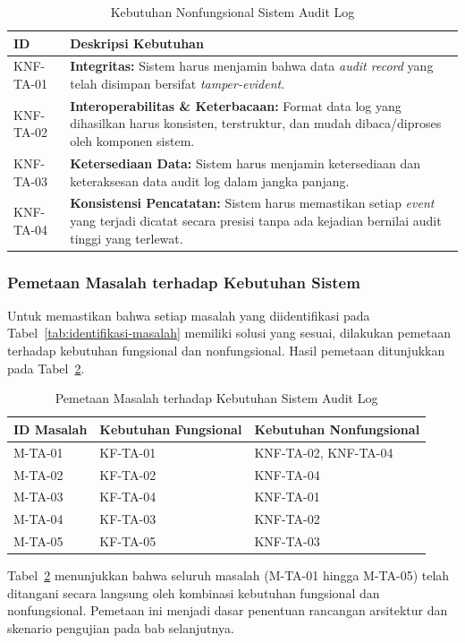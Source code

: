 \begin{table}[htbp]
    \centering
    \caption{Kebutuhan Nonfungsional Sistem Audit Log}
    \label{tab:kebutuhan-nonfungsional}
    \renewcommand{\arraystretch}{1.3}
    \begin{tabular}{|p{2cm}|p{11.5cm}|}
        \hline
        \textbf{ID} & \textbf{Deskripsi Kebutuhan} \\
        \hline
        KNF-TA-01 & \textbf{Integritas:} Sistem harus menjamin bahwa data \textit{audit record} yang telah disimpan bersifat \textit{tamper-evident}. \\
        \hline
        KNF-TA-02 & \textbf{Interoperabilitas \& Keterbacaan:} Format data log yang dihasilkan harus konsisten, terstruktur, dan mudah dibaca/diproses oleh komponen sistem. \\
        \hline
        KNF-TA-03 & \textbf{Ketersediaan Data:} Sistem harus menjamin ketersediaan dan keteraksesan data audit log dalam jangka panjang. \\
        \hline
        KNF-TA-04 & \textbf{Konsistensi Pencatatan:} Sistem harus memastikan setiap \textit{event} yang terjadi dicatat secara presisi tanpa ada kejadian bernilai audit tinggi yang terlewat. \\
        \hline
    \end{tabular}
\end{table}

\subsubsection{Pemetaan Masalah terhadap Kebutuhan Sistem}

Untuk memastikan bahwa setiap masalah yang diidentifikasi pada Tabel~\ref{tab:identifikasi-masalah} memiliki solusi yang sesuai, dilakukan pemetaan terhadap kebutuhan fungsional dan nonfungsional. Hasil pemetaan ditunjukkan pada Tabel~\ref{tab:pemetaan-masalah}.

\begin{table}[htbp]
    \centering
    \caption{Pemetaan Masalah terhadap Kebutuhan Sistem Audit Log}
    \label{tab:pemetaan-masalah}
    \renewcommand{\arraystretch}{1.3}
    \begin{tabular}{|p{2.5cm}|p{5cm}|p{5.5cm}|}
        \hline
        \textbf{ID Masalah} & \textbf{Kebutuhan Fungsional} & \textbf{Kebutuhan Nonfungsional} \\
        \hline
        M-TA-01 & KF-TA-01 & KNF-TA-02, KNF-TA-04 \\
        \hline
        M-TA-02 & KF-TA-02 & KNF-TA-04 \\
        \hline
        M-TA-03 & KF-TA-04 & KNF-TA-01 \\
        \hline
        M-TA-04 & KF-TA-03 & KNF-TA-02 \\
        \hline
        M-TA-05 & KF-TA-05 & KNF-TA-03 \\
        \hline
    \end{tabular}
\end{table}

Tabel~\ref{tab:pemetaan-masalah} menunjukkan bahwa seluruh masalah (M-TA-01 hingga M-TA-05) telah ditangani secara langsung oleh kombinasi kebutuhan fungsional dan nonfungsional. Pemetaan ini menjadi dasar penentuan rancangan arsitektur dan skenario pengujian pada bab selanjutnya.